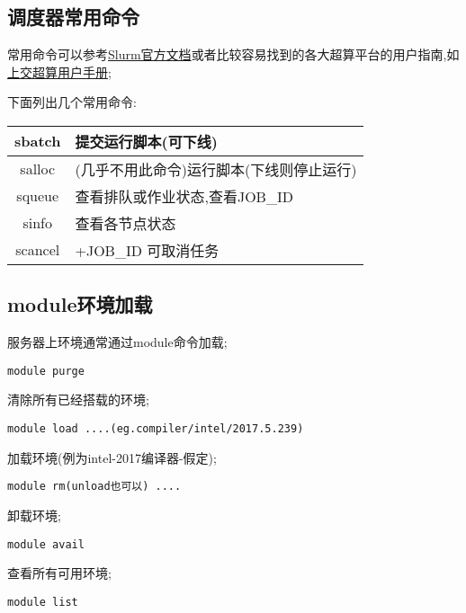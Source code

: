 \subsection{调度器常用命令}
常用命令可以参考\href{https://docs.slurm.cn/master/quick-start-user-guide.-kuai-su-ru-men-yong-hu-zhi-nan}{Slurm官方文档}或者比较容易找到的各大超算平台的用户指南,如\href{https://docs.hpc.sjtu.edu.cn/job/slurm.html}{上交超算用户手册};\par

下面列出几个常用命令:\par

\begin{tabular}{|c|l|}
	\hline 
	sbatch & 提交运行脚本(可下线) \\ 
	\hline 
	salloc & (几乎不用此命令)运行脚本(下线则停止运行) \\ 
	\hline 
	squeue & 查看排队或作业状态,查看JOB\_ID \\ 
	\hline 
	sinfo  & 查看各节点状态  \\ 
	\hline 
	scancel & +JOB\_ID 可取消任务 \\ 
	\hline 
\end{tabular} 

\subsection{module环境加载}
服务器上环境通常通过module命令加载;\par

\begin{lstlisting}[frame=single]
module purge
\end{lstlisting}
\par
清除所有已经搭载的环境;

\begin{lstlisting}[frame=single]
module load ....(eg.compiler/intel/2017.5.239)
\end{lstlisting}
\par
加载环境(例为intel-2017编译器-假定);

\begin{lstlisting}[frame=single]
module rm(unload也可以) ....
\end{lstlisting}
\par
卸载环境;

\begin{lstlisting}[frame=single]
module avail
\end{lstlisting}
\par
查看所有可用环境;

\begin{lstlisting}[frame=single]
module list
\end{lstlisting}
\par


